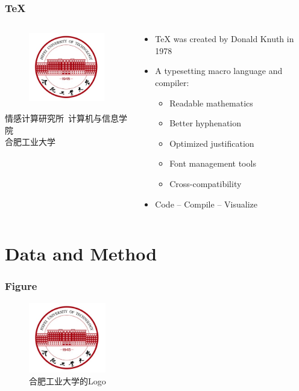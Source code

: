 \documentclass{beamer}
\begin{document}
\begin{frame}
\frametitle{\TeX{}}
\begin{columns}
\begin{column}{4cm}
	\begin{figure}
		\includegraphics[height=3cm]{logo-background.jpg}
	\end{figure}
	\begin{center}
		\tiny
		情感计算研究所\
		计算机与信息学院\\
		合肥工业大学 \\
	\end{center}
\end{column}
\begin{column}{6cm}
	\begin{itemize}
		\item \TeX{} was created by Donald Knuth in 1978
		\item A typesetting macro language and compiler:
		\begin{itemize}
			\item Readable mathematics
			\item Better hyphenation
			\item Optimized justification
			\item Font management tools
			\item Cross-compatibility
		\end{itemize}
		\item Code -- Compile -- Visualize
	\end{itemize}
\end{column}
\end{columns}
\end{frame}



\section{Data and Method}

\begin{frame}
\frametitle{Figure}
\vspace{-0.3cm}
\begin{figure}[h]
\centering
\includegraphics[width=0.3\textwidth]{logo-background.jpg}
\caption{合肥工业大学的Logo}
\end{figure}
\end{frame}
\end{document}
